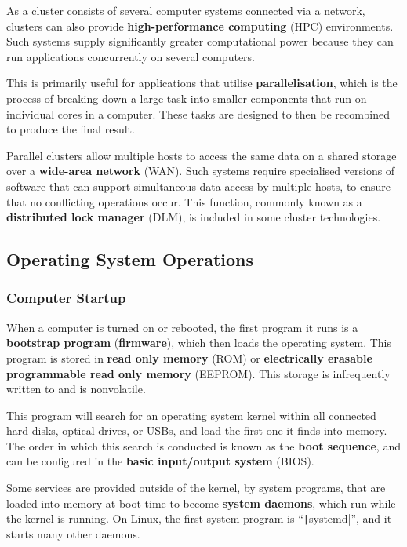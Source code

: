 \documentclass{article}
\begin{document}
\begin{tcolorboxlarge}[title={High-Performance Computing}, parbox=false]
    As a cluster consists of several computer systems connected via a network, clusters
    can also provide \textbf{high-performance computing} (HPC) environments.
    Such systems supply significantly greater computational power because they can run applications
    concurrently on several computers.

    This is primarily useful for applications that utilise
    \textbf{parallelisation}, which is the process of breaking down a large task into smaller
    components that run on individual cores in a computer. These tasks are designed to then be
    recombined to produce the final result.
\end{tcolorboxlarge}

\begin{tcolorboxlarge}[title={Parallel Clustering}, parbox=false]
    Parallel clusters allow multiple hosts to access the same data on a shared storage over
    a \textbf{wide-area network} (WAN). Such systems require specialised versions
    of software that can support simultaneous data access by multiple hosts, to ensure
    that no conflicting operations occur. This function, commonly known as a
    \textbf{distributed lock manager} (DLM), is included in some cluster technologies.
\end{tcolorboxlarge}
\subsection{Operating System Operations}
\subsubsection{Computer Startup}
When a computer is turned on or rebooted, the first program it runs is a \textbf{bootstrap program} (\textbf{firmware}), which
then loads the operating system. This program is stored in \textbf{read only memory} (ROM)
or \textbf{electrically erasable programmable read only memory} (EEPROM).
This storage is infrequently written to and is nonvolatile.

This program will search for an operating system kernel within all connected hard disks, optical drives, or USBs, and load the first one it finds into memory.
The order in which this search is conducted is known as the \textbf{boot sequence}, and can be configured in the \textbf{basic input/output system} (BIOS).

Some services are provided outside of the kernel, by system programs, that are loaded into memory at boot time to become \textbf{system daemons},
which run while the kernel is running. On Linux, the first system program is ``\texttt|systemd|'', and it starts many other daemons.
\end{document}
